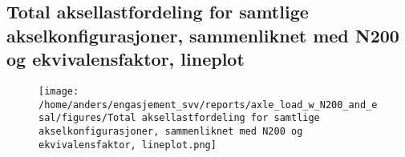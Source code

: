 \documentclass{article}
\begin{document}
\subsection{Total aksellastfordeling for samtlige akselkonfigurasjoner, sammenliknet med N200 og ekvivalensfaktor, lineplot}
\begin{figure}[H]
\centering
\texttt{[image: /home/anders/engasjement\_svv/reports/axle\_load\_w\_N200\_and\_esal/figures/Total aksellastfordeling for samtlige akselkonfigurasjoner, sammenliknet med N200 og ekvivalensfaktor, lineplot.png]}
\end{figure}
\end{document}
